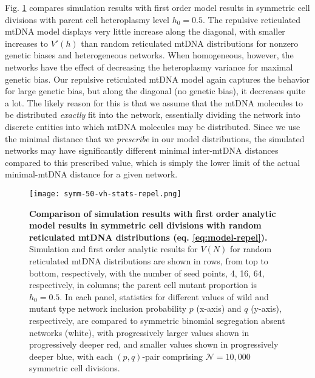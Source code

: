 \documentclass{article}
\begin{document}
\begin{appendices}
\begin{figure}[!ht]
\end{figure}
Fig. \ref{fig:app-vh-stats-repel} compares simulation results with first order model results in symmetric cell divisions with parent cell heteroplasmy level $h_0=0.5$. The repulsive reticulated mtDNA model displays very little increase along the diagonal, with smaller increases to $V'(h)$ than random reticulated mtDNA distributions for nonzero genetic biases and heterogeneous networks. When homogeneous, however, the networks have the effect of decreasing the heteroplasmy variance for maximal genetic bias. Our repulsive reticulated mtDNA model again captures the behavior for large genetic bias, but along the diagonal (no genetic bias), it decreases quite a lot. The likely reason for this is that we assume that the mtDNA molecules to be distributed \textit{exactly} fit into the network, essentially dividing the network into discrete entities into which mtDNA molecules may be distributed. Since we use the minimal distance that we \textit{prescribe} in our model distributions, the simulated networks may have significantly different minimal inter-mtDNA distances compared to this prescribed value, which is simply the lower limit of the actual minimal-mtDNA distance for a given network.
\begin{figure}[!ht]
        \centering \texttt{[image: symm-50-vh-stats-repel.png]}
        \caption{\textbf{Comparison of simulation results with first order analytic model results in symmetric cell divisions with random reticulated mtDNA distributions (eq. \ref{eq:model-repel}).} Simulation and first order analytic results for $V(N)$ for random reticulated mtDNA distributions are shown in rows, from top to bottom, respectively, with the number of seed points, 4, 16, 64, respectively, in columns; the parent cell mutant proportion is $h_0=0.5$. In each panel, statistics for different values of wild and mutant type network inclusion probability $p$ (x-axis) and $q$ (y-axis), respectively, are compared to symmetric binomial segregation absent networks (white), with progressively larger values shown in progressively deeper red, and smaller values shown in progressively deeper blue, with each $(p,q)$-pair comprising $\mathcal{N}=10,000$ symmetric cell divisions.}\label{fig:app-vh-stats-repel} 
\end{figure}

\end{appendices}
\end{document}
